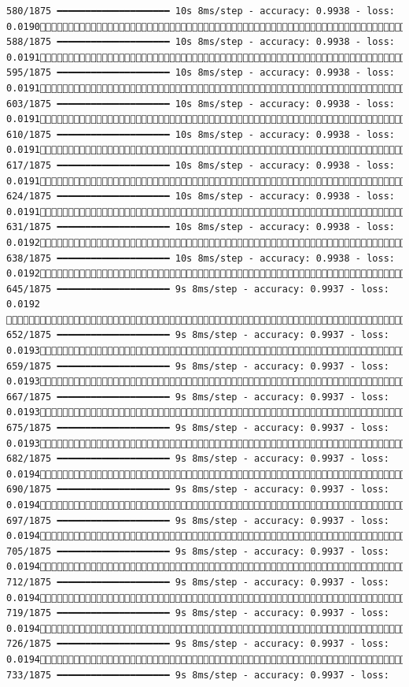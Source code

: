 \documentclass[
  letterpaper,
  DIV=11,
  numbers=noendperiod]{scrreprt}
\begin{document}
\begin{verbatim}
580/1875 ━━━━━━━━━━━━━━━━━━━━ 10s 8ms/step - accuracy: 0.9938 - loss: 0.0190 588/1875 ━━━━━━━━━━━━━━━━━━━━ 10s 8ms/step - accuracy: 0.9938 - loss: 0.0191 595/1875 ━━━━━━━━━━━━━━━━━━━━ 10s 8ms/step - accuracy: 0.9938 - loss: 0.0191 603/1875 ━━━━━━━━━━━━━━━━━━━━ 10s 8ms/step - accuracy: 0.9938 - loss: 0.0191 610/1875 ━━━━━━━━━━━━━━━━━━━━ 10s 8ms/step - accuracy: 0.9938 - loss: 0.0191 617/1875 ━━━━━━━━━━━━━━━━━━━━ 10s 8ms/step - accuracy: 0.9938 - loss: 0.0191 624/1875 ━━━━━━━━━━━━━━━━━━━━ 10s 8ms/step - accuracy: 0.9938 - loss: 0.0191 631/1875 ━━━━━━━━━━━━━━━━━━━━ 10s 8ms/step - accuracy: 0.9938 - loss: 0.0192 638/1875 ━━━━━━━━━━━━━━━━━━━━ 10s 8ms/step - accuracy: 0.9938 - loss: 0.0192 645/1875 ━━━━━━━━━━━━━━━━━━━━ 9s 8ms/step - accuracy: 0.9937 - loss: 0.0192  652/1875 ━━━━━━━━━━━━━━━━━━━━ 9s 8ms/step - accuracy: 0.9937 - loss: 0.0193 659/1875 ━━━━━━━━━━━━━━━━━━━━ 9s 8ms/step - accuracy: 0.9937 - loss: 0.0193 667/1875 ━━━━━━━━━━━━━━━━━━━━ 9s 8ms/step - accuracy: 0.9937 - loss: 0.0193 675/1875 ━━━━━━━━━━━━━━━━━━━━ 9s 8ms/step - accuracy: 0.9937 - loss: 0.0193 682/1875 ━━━━━━━━━━━━━━━━━━━━ 9s 8ms/step - accuracy: 0.9937 - loss: 0.0194 690/1875 ━━━━━━━━━━━━━━━━━━━━ 9s 8ms/step - accuracy: 0.9937 - loss: 0.0194 697/1875 ━━━━━━━━━━━━━━━━━━━━ 9s 8ms/step - accuracy: 0.9937 - loss: 0.0194 705/1875 ━━━━━━━━━━━━━━━━━━━━ 9s 8ms/step - accuracy: 0.9937 - loss: 0.0194 712/1875 ━━━━━━━━━━━━━━━━━━━━ 9s 8ms/step - accuracy: 0.9937 - loss: 0.0194 719/1875 ━━━━━━━━━━━━━━━━━━━━ 9s 8ms/step - accuracy: 0.9937 - loss: 0.0194 726/1875 ━━━━━━━━━━━━━━━━━━━━ 9s 8ms/step - accuracy: 0.9937 - loss: 0.0194 733/1875 ━━━━━━━━━━━━━━━━━━━━ 9s 8ms/step - accuracy: 0.9937 - loss: 
\end{verbatim}
\end{document}
